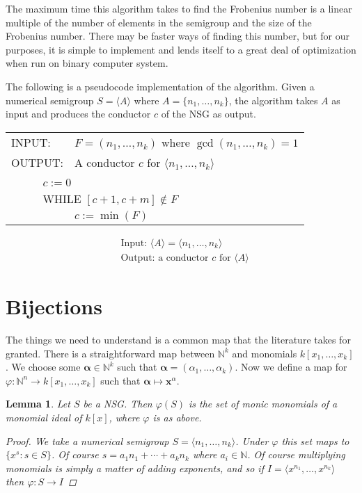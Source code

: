\documentclass[11pt]{amsart}
\theoremstyle{plain}
\newtheorem{lemma}{Lemma}
\theoremstyle{definition}
\begin{document}
The maximum time this algorithm takes to find the Frobenius number is a linear
multiple of the number of elements in the semigroup and the size of the
Frobenius number. There may be faster ways of finding this number, but for our
purposes, it is simple to implement and lends itself to a great deal of optimization when run on binary computer system.\cite{frobmask}

The following is a pseudocode implementation of the algorithm. Given a numerical semigroup $S=\langle A\rangle$ where $A=\{n_1,\dots,n_k\}$, the algorithm takes $A$ as input and produces the conductor $c$ of the NSG as output.

\begin{tabular}{lll}
\multicolumn{2}{l}{INPUT: }&$F=(n_1,\dots,n_k)$ where $\gcd(n_1,\dots,n_k)=1$\\
\multicolumn{2}{l}{OUTPUT: }&A conductor $c$ for $\langle n_1,\dots,n_k\rangle$
\\\\
\qquad&\multicolumn{2}{l}{
$c:=0$
}\\
\qquad&\multicolumn{2}{l}{
WHILE $[c+1,c+m]\not\in F$
}\\
&&$c:=\min(F)$
\end{tabular}
\begin{align*}
  &\text{Input: } \langle A\rangle=\langle n_1,\dots,n_k\rangle\\
  &\text{Output: a conductor } c \text{ for } \langle A\rangle
\end{align*}
\section{Bijections}
The things we need to understand is a common map that the literature takes for
granted. There is a straightforward map between $\mathbb{N}^k$ and monomials
$k[x_1,\dots,x_k]$. We choose some $\mathbf{\alpha}\in \mathbb{N}^k$ such that
$\mathbf{\alpha}=(\alpha_1,\dots,\alpha_k)$. Now we define a map for
$\varphi:\mathbb{N}^n\to k[x_1,\dots,x_k]$ such that $\mathbf{\alpha}\mapsto
\mathbf{x}^\alpha$.

\begin{lemma}
Let $S$ be a NSG.  Then $\varphi(S)$ is the set of monic
monomials of a monomial ideal of $k[x]$, where $\varphi$ is as above.
\begin{proof}
  We take a numerical semigroup $S=\langle n_1,\dots,n_k\rangle$. Under
$\varphi$ this set maps to $\{x^{s}:s\in S\}$. Of course $s=a_1n_1+\cdots+a_kn_k$
where $a_i\in \mathbb{N}$. Of course multiplying monomials is simply a matter
of adding exponents, and so if $I=\langle x^{n_1},\dots,x^{n_k}\rangle$ then
$\varphi:S\to I$
\end{proof}
\end{lemma}
\end{document}
